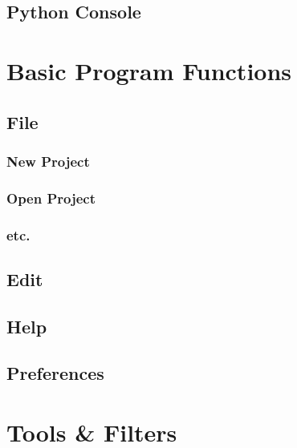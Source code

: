 \documentclass[fleqn,11pt,openany]{book}
\begin{document}
\section{Python Console}

\chapter{Basic Program Functions}

\begin{introduction}

\end{introduction}

\section{File}

\subsection{New Project}

\subsection{Open Project}

\subsection{etc.}

\section{Edit}

\section{Help}

\section{Preferences}

\chapter{Tools \& Filters}

\begin{introduction}

\end{introduction}
\end{document}
